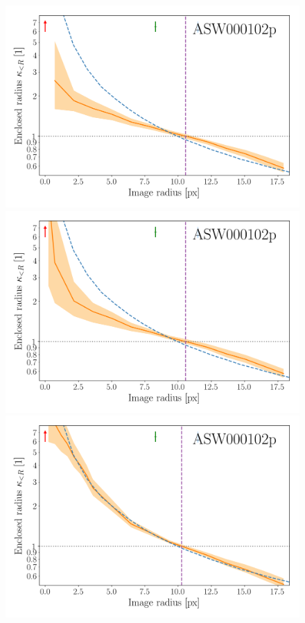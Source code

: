 \begin{figure}
\includegraphics[width=.9\linewidth]{img/hires_comparison/ASW000102p_6941_11_hires_comparison}\\
\includegraphics[width=.9\linewidth]{img/hires_comparison/ASW000102p_6941_13_hires_comparison}\\
\includegraphics[width=.9\linewidth]{img/hires_comparison/ASW000102p_6941_33_hires_comparison}

\end{figure}
